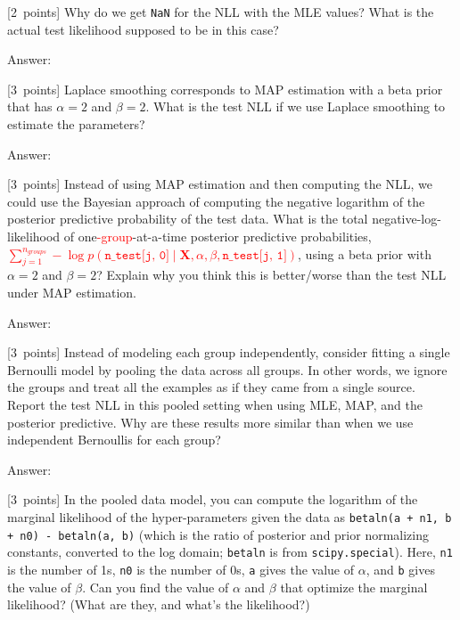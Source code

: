 \documentclass{article}
\newcommand{\ask}[1]{\textcolor{question}{#1}}
\newenvironment{answer}{\par\begingroup\color{answer}Answer: }{\endgroup}
\newcommand{\red}[1]{\textcolor{red}{#1}}
\newcommand{\pts}[1]{\textcolor{points}{[#1~points]}}
\newcommand{\TODO}{\color{red}{TODO}}
\newcommand{\bX}{\mathbf{X}}
\begin{document}
\begin{qlist}
\item \pts{2}
    \ask{Why do we get \texttt{NaN} for the NLL with the MLE values?
         What is the actual test likelihood supposed to be in this case?}

\begin{answer}\TODO\end{answer}


\item \pts{3}
    Laplace smoothing corresponds to  MAP estimation with a beta prior that has $\alpha=2$ and $\beta=2$.
    \ask{What is the test NLL if we use Laplace smoothing to estimate the parameters?} 

\begin{answer}\TODO\end{answer}

\item \pts{3}
    Instead of using MAP estimation and then computing the NLL,
    we could use the Bayesian approach of computing the negative logarithm of the posterior predictive probability of the test data.
    \ask{%
      What is the total negative-log-likelihood of one\red{-group}-at-a-time posterior predictive probabilities,
      \red{$\sum_{j=1}^{n_\mathit{groups}} -\log p( \texttt{n\_test[j, 0]} \mid \bX, \alpha, \beta, \texttt{n\_test[j, 1]})$},
      using a beta prior with $\alpha=2$ and $\beta=2$?
      Explain why you think this is better/worse than the test NLL under MAP estimation.}

\begin{answer}\TODO\end{answer}

\item \pts{3}
    Instead of modeling each group independently,
    consider fitting a single Bernoulli model by pooling the data across all groups.
    In other words, we ignore the groups and treat all the examples as if they came from a single source.
    \ask{%
      Report the test NLL in this pooled setting when using MLE, MAP, and the posterior predictive.
      Why are these results more similar than when we use independent Bernoullis for each group?
    }

\begin{answer}\TODO\end{answer}

\item \pts{3}
    In the pooled data model,
    you can compute the logarithm of the marginal likelihood of the hyper-parameters given the data as \texttt{betaln(a + n1, b + n0) - betaln(a, b)}
    (which is the ratio of posterior and prior normalizing constants, converted to the log domain; \texttt{betaln} is from \texttt{scipy.special}).
    Here, \texttt{n1} is the number of 1s, \texttt{n0} is the number of 0s, \texttt{a} gives the value of $\alpha$, and \texttt{b} gives the value of $\beta$.
    \ask{Can you find the value of $\alpha$ and $\beta$ that optimize the marginal likelihood? (What are they, and what's the likelihood?)}


\end{qlist}
\end{document}
